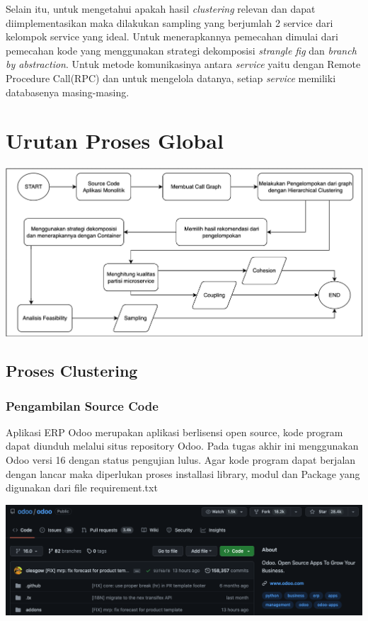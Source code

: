 Selain itu, untuk mengetahui apakah hasil \textit{clustering} relevan dan dapat diimplementasikan maka dilakukan sampling yang berjumlah 2 service dari kelompok service yang ideal. Untuk menerapkannya pemecahan dimulai dari pemecahan kode yang menggunakan strategi dekomposisi \textit{strangle fig } dan \textit{branch by abstraction}. Untuk metode komunikasinya antara \textit{service} yaitu dengan Remote Procedure Call(RPC) dan untuk mengelola datanya, setiap \textit{service} memiliki databasenya masing-masing.\\

\section{Urutan Proses Global}
\begin{center}
	\includegraphics[width=14cm]{img/bab_3/FlowchartProsesGlobal.png}
	\label{fig:proses_Global}
\end{center}

\subsection{Proses Clustering}

\subsubsection{Pengambilan Source Code}
Aplikasi ERP Odoo merupakan aplikasi berlisensi open source, kode program dapat diunduh melalui situs repository Odoo. Pada tugas akhir ini menggunakan Odoo versi 16 dengan status pengujian lulus. Agar kode program dapat berjalan dengan lancar maka diperlukan proses installasi library, modul dan Package yang digunakan dari file requirement.txt
\begin{center}
	\includegraphics[width=14cm]{img/bab_3/github.png}
	\label{fig:github_ss}
\end{center}

